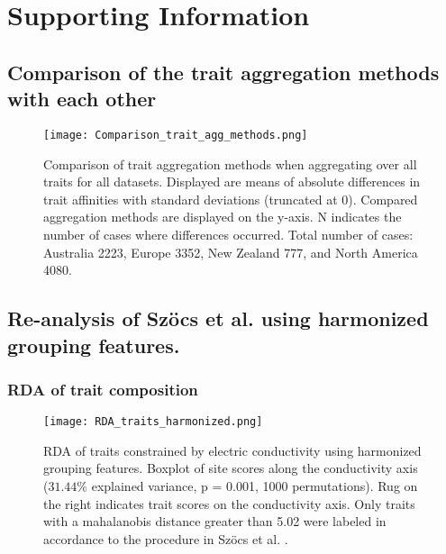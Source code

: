 \documentclass[../Draft_harmonization_paper.tex]{subfiles}
\begin{document}
\section*{Supporting Information}
\label{sec:SI}

\subsection*{Comparison of the trait aggregation methods with each other}
\label{sec:compa_aggr_methods}

\begin{figure}[H]
    \centering
    \texttt{[image: Comparison\_trait\_agg\_methods.png]}
    \caption{Comparison of trait aggregation methods when aggregating over all traits for all datasets. Displayed are means of absolute differences in trait affinities with standard deviations (truncated at 0). Compared aggregation methods are displayed on the y-axis. N indicates the number of cases where differences occurred. Total number of cases: Australia 2223, Europe 3352, New Zealand 777, and North America 4080.}
    \label{fig:comp_aggr_methods}
\end{figure}


\newpage

\subsection*{Re-analysis of Szöcs et al. using harmonized grouping features.}
\label{subsec:SI_szoecs_reanalysis}

\subsubsection*{RDA of trait composition}

\begin{figure}[H]
    \centering
    \texttt{[image: RDA\_traits\_harmonized.png]}
    \caption{RDA of traits constrained by electric conductivity using harmonized grouping features. Boxplot of site scores along the conductivity axis ($31.44 \%$ explained variance, p = 0.001, 1000 permutations). Rug on the right indicates trait scores on the conductivity axis. Only traits with a mahalanobis distance greater than 5.02 were labeled in accordance to the procedure in Szöcs et al. \cite{szocs_effects_2014}.
    } 
\end{figure}
\end{document}
